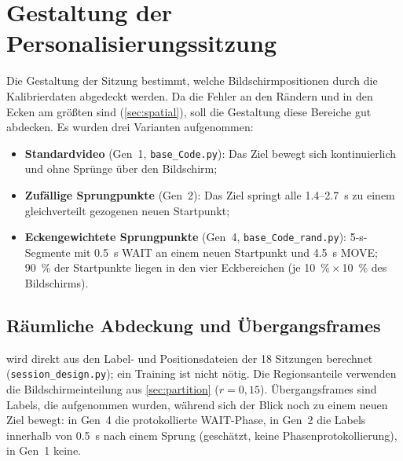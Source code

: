 \documentclass[
  11pt,
  a4paper,
  oneside,
  DIV=12,
  BCOR=8mm,
  parskip=half,
  headings=normal,
  bibliography=totoc,
  listof=totoc
]{scrreprt}
\newcommand{\code}[1]{\texttt{#1}}
\begin{document}
\section{Gestaltung der Personalisierungssitzung}
\label{sec:session_design}

Die Gestaltung der Sitzung bestimmt, welche Bildschirmpositionen durch die
Kalibrierdaten abgedeckt werden. Da die Fehler an den Rändern und in den Ecken
am größten sind (\cref{sec:spatial}), soll die Gestaltung diese Bereiche gut
abdecken. Es wurden drei Varianten aufgenommen:
\begin{itemize}[nosep]
  \item \textbf{Standardvideo} (Gen~1, \code{base\_Code.py}): Das Ziel bewegt
        sich kontinuierlich und ohne Sprünge über den Bildschirm;
  \item \textbf{Zufällige Sprungpunkte} (Gen~2): Das Ziel springt alle
        \SI{1,4}{}--\SI{2,7}{\second} zu einem gleichverteilt gezogenen neuen
        Startpunkt;
  \item \textbf{Eckengewichtete Sprungpunkte} (Gen~4,
        \code{base\_Code\_rand.py}): 5-s-Segmente mit \SI{0,5}{\second} WAIT
        an einem neuen Startpunkt und \SI{4,5}{\second} MOVE;
        \SI{90}{\percent} der Startpunkte liegen in den vier Eckbereichen (je
        \SI{10}{\percent}\,$\times$\,\SI{10}{\percent} des Bildschirms).
\end{itemize}

\subsection{Räumliche Abdeckung und Übergangsframes}

 wird direkt aus den Label- und Positionsdateien der 18
Sitzungen berechnet (\code{session\_design.py}); ein Training ist nicht
nötig. Die Regionsanteile verwenden die Bildschirmeinteilung aus
\cref{sec:partition} ($r=0,15$). Übergangsframes sind Labels, die
aufgenommen wurden, während sich der Blick noch zu einem neuen Ziel bewegt:
in Gen~4 die protokollierte WAIT-Phase, in Gen~2 die Labels innerhalb von
\SI{0,5}{\second} nach einem Sprung (geschätzt, keine Phasenprotokollierung),
in Gen~1 keine.
\end{document}
